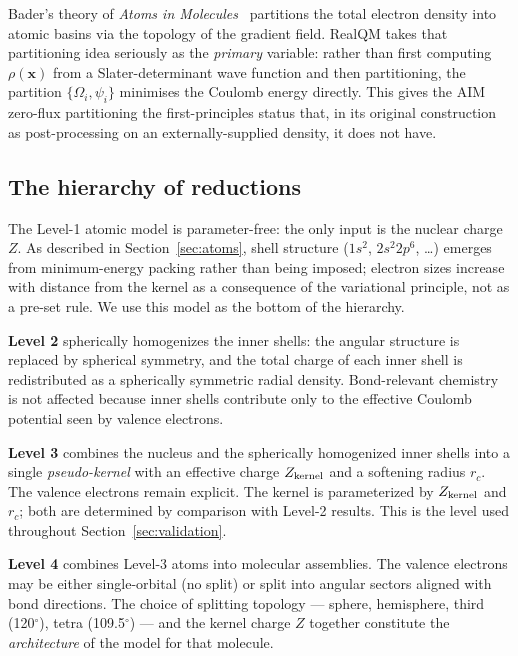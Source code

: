\documentclass[11pt]{article}
\begin{document}
Bader's theory of \emph{Atoms in Molecules}~\cite{Bader90} partitions the total electron density into atomic basins via the topology of the gradient field. RealQM takes that partitioning idea seriously as the \emph{primary} variable: rather than first computing $\rho(\mathbf{x})$ from a Slater-determinant wave function and then partitioning, the partition $\{\Omega_i, \psi_i\}$ minimises the Coulomb energy directly. This gives the AIM zero-flux partitioning the first-principles status that, in its original construction as post-processing on an externally-supplied density, it does not have.

\subsection{The hierarchy of reductions}

The Level-1 atomic model is parameter-free: the only input is the nuclear charge $Z$. As described in Section~\ref{sec:atoms}, shell structure ($1s^2$, $2s^2 2p^6$, \ldots) emerges from minimum-energy packing rather than being imposed; electron sizes increase with distance from the kernel as a consequence of the variational principle, not as a pre-set rule. We use this model as the bottom of the hierarchy.

\textbf{Level 2} spherically homogenizes the inner shells: the angular structure is replaced by spherical symmetry, and the total charge of each inner shell is redistributed as a spherically symmetric radial density. Bond-relevant chemistry is not affected because inner shells contribute only to the effective Coulomb potential seen by valence electrons.

\textbf{Level 3} combines the nucleus and the spherically homogenized inner shells into a single \emph{pseudo-kernel} with an effective charge $Z_{\rm kernel}$ and a softening radius $r_c$. The valence electrons remain explicit. The kernel is parameterized by $Z_{\rm kernel}$ and $r_c$; both are determined by comparison with Level-2 results. This is the level used throughout Section~\ref{sec:validation}.

\textbf{Level 4} combines Level-3 atoms into molecular assemblies. The valence electrons may be either single-orbital (no split) or split into angular sectors aligned with bond directions. The choice of splitting topology --- sphere, hemisphere, third (120$^\circ$), tetra (109.5$^\circ$) --- and the kernel charge $Z$ together constitute the \emph{architecture} of the model for that molecule.
\end{document}
